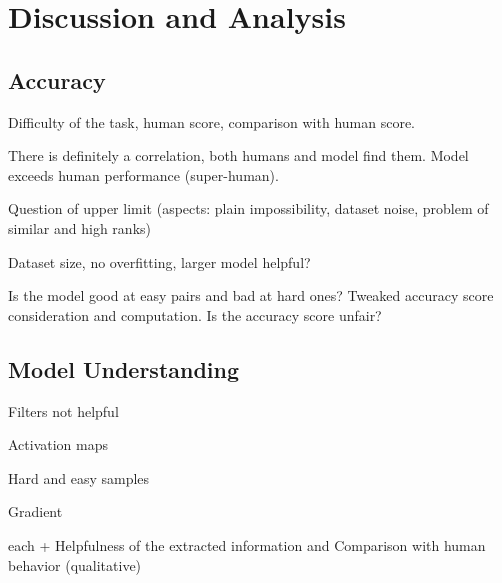 \section{Discussion and Analysis}

\subsection{Accuracy}

Difficulty of the task, human score, comparison with human score.

There is definitely a correlation, both humans and model find them. Model exceeds human performance (super-human).

Question of upper limit (aspects: plain impossibility, dataset noise, problem of similar and high ranks)

Dataset size, no overfitting, larger model helpful?

Is the model good at easy pairs and bad at hard ones? Tweaked accuracy score consideration and computation. Is the accuracy score unfair?

\subsection{Model Understanding}

Filters not helpful

Activation maps

Hard and easy samples

Gradient

each + Helpfulness of the extracted information and Comparison with human behavior (qualitative)
